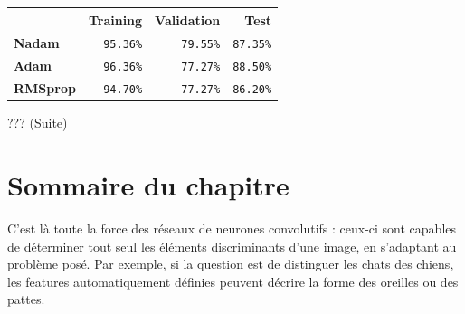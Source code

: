 	
	\begin{table}[H]
		\centering
		\begin{tabular}{l|r|r|r}
			\hline
			 & \textbf{Training} & \textbf{Validation} & \textbf{Test} \\
			
			\hline
			\textbf{Nadam} &
			\texttt{95.36\%} &
			\texttt{79.55\%} &
			\texttt{87.35\%} \\
			\hline
			\textbf{Adam} &
			\texttt{96.36\%} &
			\texttt{77.27\%} &
			\texttt{88.50\%} \\
			\hline
			\textbf{RMSprop} &
			\texttt{94.70\%} &
			\texttt{77.27\%} &
			\texttt{86.20\%} \\
			\hline
			
		\end{tabular}
	\end{table}
	
	??? (Suite)	
	
	
	
	
	
	
	\section{Sommaire du chapitre}
	C’est là toute la force des réseaux de neurones convolutifs : ceux-ci sont capables de déterminer tout seul les éléments discriminants d'une image, en s'adaptant au problème posé. Par exemple, si la question est de distinguer les chats des chiens, les features automatiquement définies peuvent décrire la forme des oreilles ou des pattes. 
	

